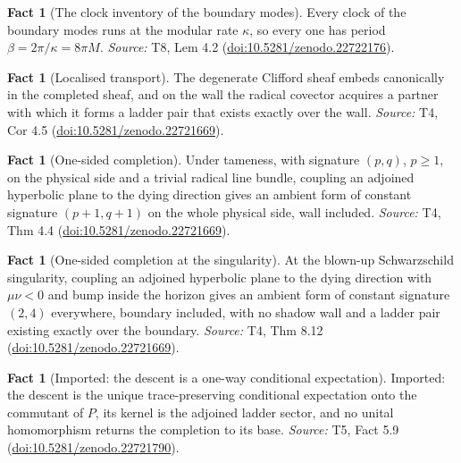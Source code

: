 \documentclass[11pt]{article}
\theoremstyle{definition}
\newtheorem{fact}[theorem]{Fact}
\theoremstyle{plain}
\begin{document}
\begin{fact}[The clock inventory of the boundary modes]\label{c:scrambling.clock-inventory-boundary-modes}
Every clock of the boundary modes runs at the modular rate $\kappa$, so every one has period $\beta = 2\pi/\kappa = 8\pi M$.
\emph{Source:} T8, Lem 4.2 (\href{https://doi.org/10.5281/zenodo.22722176}{doi:10.5281/zenodo.22722176}).
\end{fact}

\begin{fact}[Localised transport]\label{c:sheaf.localised-transport}
The degenerate Clifford sheaf embeds canonically in the completed sheaf, and on the wall the radical covector acquires a partner with which it forms a ladder pair that exists exactly over the wall.
\emph{Source:} T4, Cor 4.5 (\href{https://doi.org/10.5281/zenodo.22721669}{doi:10.5281/zenodo.22721669}).
\end{fact}

\begin{fact}[One-sided completion]\label{c:sheaf.one-sided-completion}
Under tameness, with signature $(p,q)$, $p \geq 1$, on the physical side and a trivial radical line bundle, coupling an adjoined hyperbolic plane to the dying direction gives an ambient form of constant signature $(p{+}1, q{+}1)$ on the whole physical side, wall included.
\emph{Source:} T4, Thm 4.4 (\href{https://doi.org/10.5281/zenodo.22721669}{doi:10.5281/zenodo.22721669}).
\end{fact}

\begin{fact}[One-sided completion at the singularity]\label{c:sheaf.one-sided-completion-singularity}
At the blown-up Schwarzschild singularity, coupling an adjoined hyperbolic plane to the dying direction with $\mu\nu < 0$ and bump inside the horizon gives an ambient form of constant signature $(2,4)$ everywhere, boundary included, with no shadow wall and a ladder pair existing exactly over the boundary.
\emph{Source:} T4, Thm 8.12 (\href{https://doi.org/10.5281/zenodo.22721669}{doi:10.5281/zenodo.22721669}).
\end{fact}

\begin{fact}[Imported: the descent is a one-way conditional expectation]\label{c:singularity.imported-descent-one-way-conditional-expectation}
Imported: the descent is the unique trace-preserving conditional expectation onto the commutant of $P$, its kernel is the adjoined ladder sector, and no unital homomorphism returns the completion to its base.
\emph{Source:} T5, Fact 5.9 (\href{https://doi.org/10.5281/zenodo.22721790}{doi:10.5281/zenodo.22721790}).
\end{fact}
\end{document}
